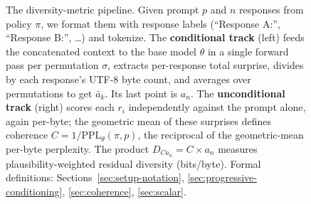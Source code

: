 \begin{figure}[tbp]
\caption{The diversity-metric pipeline.
Given prompt $p$ and $n$ responses from policy $\pi$, we format them with response labels (``Response A:'', ``Response B:'', \ldots) and tokenize.
The \textcolor{orange!70!black}{\textbf{conditional track}} (left) feeds the concatenated context to the base model $\theta$ in a single forward pass per permutation $\sigma$, extracts per-response total surprise, divides by each response's UTF-8 byte count, and averages over permutations to get $\bar a_k$.
Its last point is $a_n$.
The \textcolor{blue!70!black}{\textbf{unconditional track}} (right) scores each $r_i$ independently against the prompt alone, again per-byte; the geometric mean of these surprises defines coherence $C = 1/\mathrm{PPL}_\theta(\pi, p)$, the reciprocal of the geometric-mean per-byte perplexity.
The product $D_{Ca_n} = C \times a_n$ measures plausibility-weighted residual diversity (bits/byte).
Formal definitions: Sections~\ref{sec:setup-notation}, \ref{sec:progressive-conditioning}, \ref{sec:coherence}, \ref{sec:scalar}.}
\label{fig:pipeline}
\end{figure}

